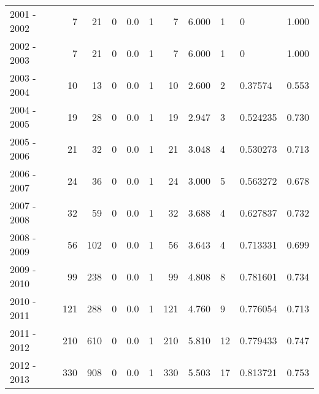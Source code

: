 \begin{tabular}{lrrrrrrrllr}
2001 - 2002 &        7 &       21 &                 0 &               0.0 &                       1 &                          7 &       6.000 &             1 &          0 &             1.000 \\
2002 - 2003 &        7 &       21 &                 0 &               0.0 &                       1 &                          7 &       6.000 &             1 &          0 &             1.000 \\
2003 - 2004 &       10 &       13 &                 0 &               0.0 &                       1 &                         10 &       2.600 &             2 &    0.37574 &             0.553 \\
2004 - 2005 &       19 &       28 &                 0 &               0.0 &                       1 &                         19 &       2.947 &             3 &   0.524235 &             0.730 \\
2005 - 2006 &       21 &       32 &                 0 &               0.0 &                       1 &                         21 &       3.048 &             4 &   0.530273 &             0.713 \\
2006 - 2007 &       24 &       36 &                 0 &               0.0 &                       1 &                         24 &       3.000 &             5 &   0.563272 &             0.678 \\
2007 - 2008 &       32 &       59 &                 0 &               0.0 &                       1 &                         32 &       3.688 &             4 &   0.627837 &             0.732 \\
2008 - 2009 &       56 &      102 &                 0 &               0.0 &                       1 &                         56 &       3.643 &             4 &   0.713331 &             0.699 \\
2009 - 2010 &       99 &      238 &                 0 &               0.0 &                       1 &                         99 &       4.808 &             8 &   0.781601 &             0.734 \\
2010 - 2011 &      121 &      288 &                 0 &               0.0 &                       1 &                        121 &       4.760 &             9 &   0.776054 &             0.713 \\
2011 - 2012 &      210 &      610 &                 0 &               0.0 &                       1 &                        210 &       5.810 &            12 &   0.779433 &             0.747 \\
2012 - 2013 &      330 &      908 &                 0 &               0.0 &                       1 &                        330 &       5.503 &            17 &   0.813721 &             0.753 \\

\end{tabular}
